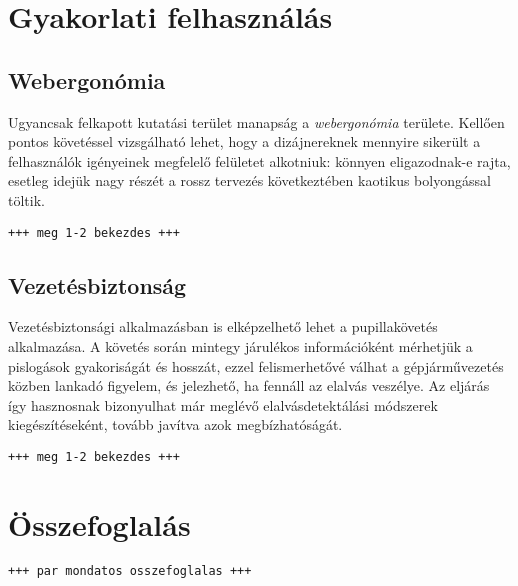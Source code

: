 \section{Gyakorlati felhasználás}\label{sect:gyakorlati}


\subsection{Webergonómia}\label{sect:webergonomia}

Ugyancsak felkapott kutatási terület manapság a \emph{webergonómia} területe. Kellően pontos követéssel vizsgálható lehet, hogy a dizájnereknek mennyire sikerült a felhasználók igényeinek megfelelő felületet alkotniuk: könnyen eligazodnak-e rajta, esetleg idejük nagy részét a rossz tervezés következtében kaotikus bolyongással töltik.

\texttt{+++ meg 1-2 bekezdes +++}

\subsection{Vezetésbiztonság}\label{sect:orvosi_felhasznalas}

Vezetésbiztonsági alkalmazásban is elképzelhető lehet a pupillakövetés alkalmazása. A követés során mintegy járulékos információként mérhetjük a pislogások gyakoriságát és hosszát, ezzel felismerhetővé válhat a gépjárművezetés közben lankadó figyelem, és jelezhető, ha fennáll az elalvás veszélye. Az eljárás így hasznosnak bizonyulhat már meglévő elalvásdetektálási módszerek \cite{sleepdet} kiegészítéseként, tovább javítva azok megbízhatóságát.

\texttt{+++ meg 1-2 bekezdes +++}

\section{Összefoglalás}\label{sect:felh_osszefoglalas}

\texttt{+++ par mondatos osszefoglalas +++}